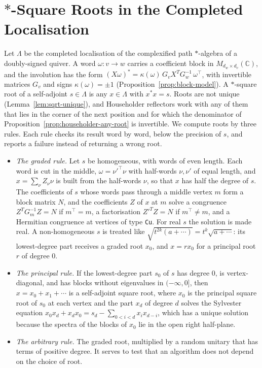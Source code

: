 \documentclass[12pt, a4paper]{report}
\theoremstyle{plain}
\theoremstyle{definition}
\theoremstyle{remark}
\theoremstyle{plain}
\newcommand{\CC}{\mathbb{C}}
\begin{document}
\section{\texorpdfstring{$*$}{*}-Square Roots in the Completed Localisation}
\label{sec:lambda-sqrt}
Let $\Lambda$ be the completed localisation of the complexified path $*$-algebra of a doubly-signed quiver. A word $\omega:v\to w$ carries a coefficient block in $M_{d_w\times d_v}(\CC)$, and the involution has the form $(X\omega)^*=\kappa(\omega)\,G_vX^TG_w^{-1}\,\omega^{\top}$, with invertible matrices $G_v$ and signs $\kappa(\omega)=\pm1$ (Proposition~\ref{prop:block-model}). A $*$-square root of a self-adjoint $s\in\Lambda$ is any $x\in\Lambda$ with $x^*x=s$. Roots are not unique (Lemma~\ref{lem:sqrt-unique}), and Householder reflectors work with any of them that lies in the corner of the next position and for which the denominator of Proposition~\ref{prop:householder-any-root} is invertible. We compute roots by three rules. Each rule checks its result word by word, below the precision of $s$, and reports a failure instead of returning a wrong root.
\begin{itemize}
  \item \emph{The graded rule.} Let $s$ be homogeneous, with words of even length. Each word is cut in the middle, $\omega=\nu'^{\top}\nu$ with half-words $\nu,\nu'$ of equal length, and $x=\sum_\nu Z_\nu\nu$ is built from the half-words $\nu$, so that $x$ has half the degree of $s$. The coefficients of $s$ whose words pass through a middle vertex $m$ form a block matrix $N$, and the coefficients $Z$ of $x$ at $m$ solve a congruence $Z^TG_m^{-1}Z=N$ if $m^{\top}=m$, a factorisation $Z'^TZ=N$ if $m^{\top}\neq m$, and a Hermitian congruence at vertices of type \texttt{Cu}. For real $s$ the solution is made real. A non-homogeneous $s$ is treated like $\sqrt{t^{2k}(a+\cdots)}=t^k\sqrt{a+\cdots}$: its lowest-degree part receives a graded root $x_0$, and $x=rx_0$ for a principal root $r$ of degree $0$.
  \item \emph{The principal rule.} If the lowest-degree part $s_0$ of $s$ has degree $0$, is vertex-diagonal, and has blocks without eigenvalues in $(-\infty,0]$, then $x=x_0+x_1+\cdots$ is a self-adjoint square root, where $x_0$ is the principal square root of $s_0$ at each vertex and the part $x_d$ of degree $d$ solves the Sylvester equation $x_0x_d+x_dx_0=s_d-\sum_{0<i<d}x_ix_{d-i}$, which has a unique solution because the spectra of the blocks of $x_0$ lie in the open right half-plane.
  \item \emph{The arbitrary rule.} The graded root, multiplied by a random unitary that has terms of positive degree. It serves to test that an algorithm does not depend on the choice of root.
\end{itemize}
\end{document}
